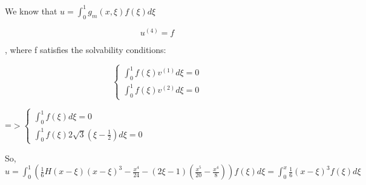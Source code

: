 \documentclass{article}
\begin{document}
\subsection{}

{\raggedright
We know that $u=\int_0^1g_m\left(x,\xi{}\right)f\left(\xi{}\right)d\xi{}$
}

{\raggedright


\[
u^{(4)}=f
\]

, where f satisfies the solvability conditions:
}

{\raggedright


\[
\left\{\begin{array}{l}\int_0^1f\left(\xi{}\right)v^{(1)}d\xi{}=0 \\
\int_0^1f\left(\xi{}\right)v^{(2)}d\xi{}=0\end{array}\right.
\]

=$>$$\left\{\begin{array}{l}\int_0^1f\left(\xi{}\right)d\xi{}=0 \\
\int_0^1f\left(\xi{}\right)2\sqrt{3}(\xi{}-\frac{1}{2})d\xi{}=0\end{array}\right.$
}

{\raggedright
So,
$u=\int_0^1(\frac{1}{6}{H\left(x-\xi{}\right)\left(x-\xi{}\right)}^3-\frac{x^4}{24}-\left(2\xi{}-1\right)\left(\frac{x^5}{20}-\frac{x^4}{8}\right))f\left(\xi{}\right)d\xi{}=\int_0^x\frac{1}{6}{\left(x-\xi{}\right)}^3f\left(\xi{}\right)d\xi{}$
}
\end{document}
